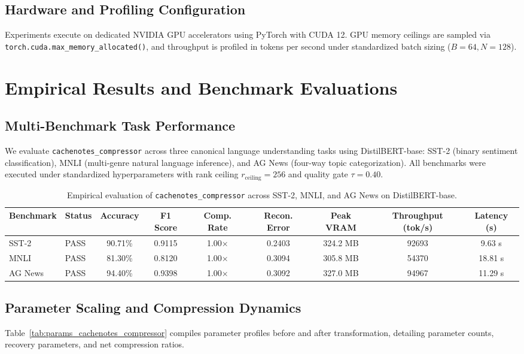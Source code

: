 \subsection{Hardware and Profiling Configuration}
Experiments execute on dedicated NVIDIA GPU accelerators using PyTorch with CUDA 12. GPU memory ceilings are sampled via \texttt{torch.cuda.max\_memory\_allocated()}, and throughput is profiled in tokens per second under standardized batch sizing ($B=64, N=128$).


\section{Empirical Results and Benchmark Evaluations}
\label{sec:results}

\subsection{Multi-Benchmark Task Performance}
We evaluate \texttt{cachenotes\_compressor} across three canonical language understanding tasks using DistilBERT-base: SST-2 (binary sentiment classification), MNLI (multi-genre natural language inference), and AG News (four-way topic categorization). All benchmarks were executed under standardized hyperparameters with rank ceiling $r_{\mathrm{ceiling}} = 256$ and quality gate $\tau = 0.40$.

\begin{table}[t]
\centering
\small
\begin{tabular}{llccccccc}
\toprule
\textbf{Benchmark} & \textbf{Status} & \textbf{Accuracy} & \textbf{F1 Score} & \textbf{Comp. Rate} & \textbf{Recon. Error} & \textbf{Peak VRAM} & \textbf{Throughput (tok/s)} & \textbf{Latency (s)} \\
\midrule
SST-2 & PASS & 90.71\% & 0.9115 & 1.00$\times$ & 0.2403 & 324.2 MB & 92693 & 9.63 s \\
MNLI & PASS & 81.30\% & 0.8120 & 1.00$\times$ & 0.3094 & 305.8 MB & 54370 & 18.81 s \\
AG News & PASS & 94.40\% & 0.9398 & 1.00$\times$ & 0.3092 & 327.0 MB & 94967 & 11.29 s \\
\bottomrule
\end{tabular}
\caption{Empirical evaluation of \texttt{cachenotes\_compressor} across SST-2, MNLI, and AG News on DistilBERT-base.}
\label{tab:results_cachenotes_compressor}
\end{table}

\subsection{Parameter Scaling and Compression Dynamics}
Table~\ref{tab:params_cachenotes_compressor} compiles parameter profiles before and after transformation, detailing parameter counts, recovery parameters, and net compression ratios.


